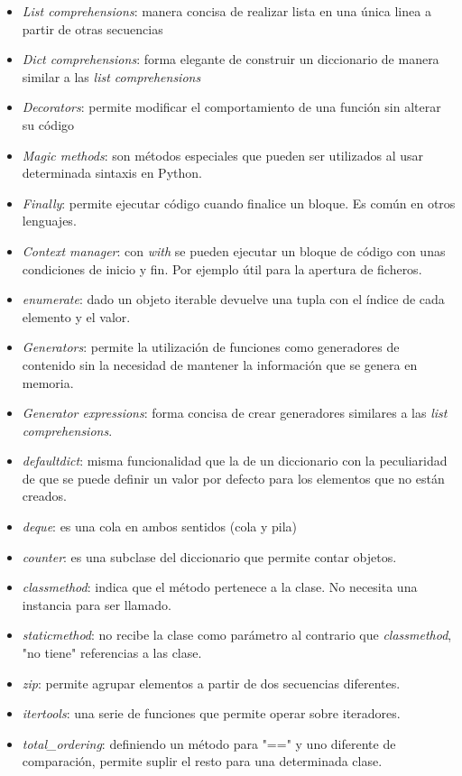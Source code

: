 \documentclass[a4paper, 12pt]{book}
\begin{document}
\begin{itemize}
    \item \textit{List comprehensions}: manera concisa de realizar lista en una única linea a partir de otras secuencias
    \item \textit{Dict comprehensions}: forma elegante de construir un diccionario de manera similar a las \textit{list comprehensions}
    \item \textit{Decorators}: permite modificar el comportamiento de una función sin alterar su código
    \item \textit{Magic methods}: son métodos especiales que pueden ser utilizados al usar determinada sintaxis en Python.
    \item \textit{Finally}: permite ejecutar código cuando finalice un bloque. Es común en otros lenguajes.
    \item \textit{Context manager}: con \textit{with} se pueden ejecutar un bloque de código con unas condiciones de inicio y fin. Por ejemplo útil para la apertura de ficheros.
    \item \textit{enumerate}: dado un objeto iterable devuelve una tupla con el índice de cada elemento y el valor.
    \item \textit{Generators}: permite la utilización de funciones como generadores de contenido sin la necesidad de mantener la información que se genera en memoria.
    \item \textit{Generator expressions}: forma concisa de crear generadores similares a las \textit{list comprehensions}.
    \item \textit{defaultdict}: misma funcionalidad que la de un diccionario con la peculiaridad de que se puede definir un valor por defecto para los elementos que no están creados.
    \item \textit{deque}: es una cola en ambos sentidos (cola y pila)
    \item \textit{counter}: es una subclase del diccionario que permite contar objetos.
    \item \textit{classmethod}: indica que el método pertenece a la clase. No necesita una instancia para ser llamado.
    \item \textit{staticmethod}: no recibe la clase como parámetro al contrario que \textit{classmethod}, "no tiene" referencias a las clase.
    \item \textit{zip}: permite agrupar elementos a partir de dos secuencias diferentes.
    \item \textit{itertools}: una serie de funciones que permite operar sobre iteradores.
    \item \textit{total\_ordering}: definiendo un método para "==" y uno diferente de comparación, permite suplir el resto para una determinada clase.
\end{itemize}
\end{document}
